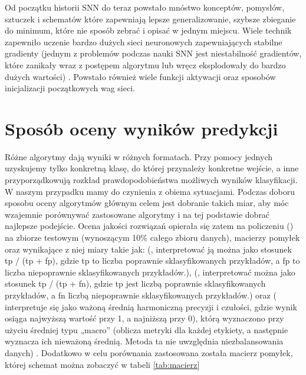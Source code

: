 Od początku historii SNN do teraz powstało mnóstwo konceptów, pomysłów, sztuczek i schematów które zapewniają lepsze generalizowanie, szybsze zbieganie do minimum, które nie sposób zebrać i opisać w jednym miejscu. Wiele technik zapewniło uczenie bardzo dużych sieci neuronowych zapewniających stabilne gradienty (jednym z problemów podczas nauki SNN jest niestabilność gradientów, które zanikały wraz z postępem algorytmu lub wręcz eksplodowały do bardzo dużych wartości) \cite{gradient}. Powstało również wiele funkcji aktywacji oraz sposobów inicjalizacji początkowych wag sieci.

\section{Sposób oceny wyników predykcji}
\label{section:ocenaWynikow}

Różne algorytmy dają wyniki w różnych formatach. Przy pomocy jednych uzyskujemy tylko konkretną klasę, do której przynależy konkretne wejście, a inne przyporządkowują rozkład prawdopodobieństwa możliwych wyników klasyfikacji. W naszym przypadku mamy do czynienia z obiema sytuacjami. Podczas doboru sposobu oceny algorytmów głównym celem jest dobranie takich miar, aby móc wzajemnie porównywać zastosowane algorytmy i na tej podstawie dobrać najlepsze podejście. Ocena jakości rozwiązań opierała się zatem na policzeniu  () na zbiorze testowym (wynoszącym 10\% całego zbioru danych), macierzy pomyłek oraz wynikające z niej miary takie jak:  (, interpretować ją można jako stosunek tp / (tp + fp), gdzie tp to liczba poprawnie sklasyfikowanych przykładów, a fp to liczba niepoprawnie sklasyfikowanych przykładów.),  (, interpretować można jako stosunek tp / (tp + fn), gdzie tp jest liczbą poprawnie sklasyfikowanych przykładów, a fn liczbą niepoprawnie sklasyfikowanych przykładów.) oraz  ( interpretuje się jako ważoną średnią harmoniczną precyzji i czułości, gdzie wynik  osiąga najwyższą wartość przy 1, a najniższą przy 0), którą wyznaczono przy użyciu średniej typu „macro” (oblicza metryki dla każdej etykiety, a następnie wyznacza ich nieważoną średnią. Metoda ta nie uwzględnia niezbalansowania danych) \cite{SKfscore}. Dodatkowo w celu porównania zastosowana została macierz pomyłek, której schemat można zobaczyć w tabeli \ref{tab:macierz}

